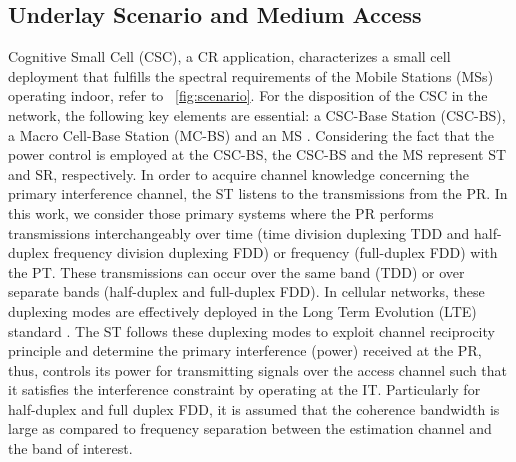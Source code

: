 \subsection{Underlay Scenario and Medium Access}

Cognitive Small Cell (CSC), a CR application, characterizes a small cell deployment that fulfills the spectral requirements of the Mobile Stations (MSs) operating indoor, refer to \figurename~\ref{fig:scenario}.
For the disposition of the CSC in the network, the following key elements are essential: a CSC-Base Station (CSC-BS), a Macro Cell-Base Station (MC-BS) and an MS \cite{Kaushik16}.
Considering the fact that the power control is employed at the CSC-BS, the CSC-BS and the MS represent ST and SR, respectively. In order to acquire channel knowledge concerning the primary interference channel, the ST listens to the transmissions from the PR. In this work, we consider those primary systems where the PR performs transmissions interchangeably over time (time division duplexing TDD and half-duplex frequency division duplexing FDD) or frequency (full-duplex FDD) with the PT. These transmissions can occur over the same band (TDD) or over separate bands (half-duplex and full-duplex FDD). 
In cellular networks, these duplexing modes are effectively deployed in the Long Term Evolution (LTE) standard \cite{LTE09}. The ST follows these duplexing modes to exploit channel reciprocity principle and determine the primary interference (power) received at the PR, thus, controls its power for transmitting signals over the access channel such that it satisfies the interference constraint by operating at the IT. Particularly for half-duplex and full duplex FDD, it is assumed that the coherence bandwidth is large as compared to frequency separation between the estimation channel and the band of interest. 

